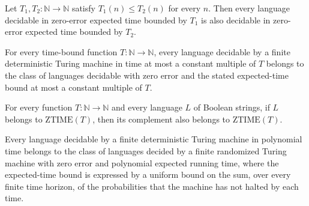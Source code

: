 \begin{theorem}
\label{Randomized.ZTIME.mono}
\leanok
{}
Let $T_1,T_2:\mathbb{N}\to\mathbb{N}$ satisfy $T_1(n)\le T_2(n)$ for every $n$. Then
every language decidable in zero-error expected time bounded by $T_1$ is also decidable
in zero-error expected time bounded by $T_2$.
\end{theorem}

\begin{theorem}
\label{Randomized.DTIME_subset_ZTIME}
\leanok
{}
For every time-bound function $T\colon\mathbb{N}\to\mathbb{N}$, every language decidable
by a finite deterministic Turing machine in time at most a constant multiple of $T$
belongs to the class of languages decidable with zero error and the stated expected-time
bound at most a constant multiple of $T$.
\end{theorem}

\begin{theorem}
\label{Randomized.compl_mem_ZTIME}
\leanok
{}
For every function $T:\mathbb{N}\to\mathbb{N}$ and every language $L$ of Boolean
strings, if $L$ belongs to $\mathrm{ZTIME}(T)$, then its complement also belongs to
$\mathrm{ZTIME}(T)$.
\end{theorem}

\begin{theorem}
\label{Randomized.P_subset_ZPP_PTM}
\leanok
{}
Every language decidable by a finite deterministic Turing machine in polynomial time
belongs to the class of languages decided by a finite randomized Turing machine with
zero error and polynomial expected running time, where the expected-time bound is
expressed by a uniform bound on the sum, over every finite time horizon, of the
probabilities that the machine has not halted by each time.
\end{theorem}

